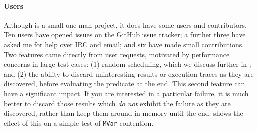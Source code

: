 \paragraph{Users}
Although \dejafu{} is a small one-man project, it does have some users
and contributors.  Ten users have opened issues on the GitHub issue
tracker; a further three have asked me for help over IRC and email;
and six have made small contributions.  Two features came directly
from user requests, motivated by performance concerns in large test
cases: (1) random scheduling, which we discuss further in
; and (2) the ability to discard uninteresting
results or execution traces as they are discovered, before evaluating
the predicate at the end.  This second feature can have a significant
impact.  If you are interested in a particular failure, it is much
better to discard those results which \emph{do not} exhibit the
failure as they are discovered, rather than keep them around in memory
until the end.   shows the effect of this on a
simple test of \verb|MVar| contention.

